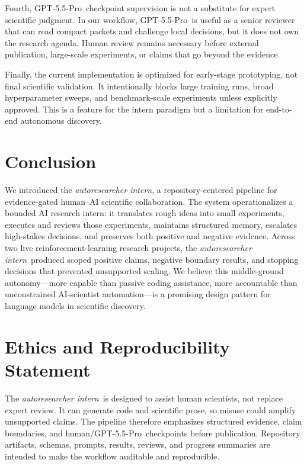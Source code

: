 \documentclass{article}
\newcommand{\intern}{\emph{autoresearcher intern}}
\newcommand{\gptpro}{GPT-5.5-Pro}
\begin{document}
Fourth, \gptpro\ checkpoint supervision is not a substitute for expert scientific judgment. In our workflow, \gptpro\ is useful as a senior reviewer that can read compact packets and challenge local decisions, but it does not own the research agenda. Human review remains necessary before external publication, large-scale experiments, or claims that go beyond the evidence.

Finally, the current implementation is optimized for early-stage prototyping, not final scientific validation. It intentionally blocks large training runs, broad hyperparameter sweeps, and benchmark-scale experiments unless explicitly approved. This is a feature for the intern paradigm but a limitation for end-to-end autonomous discovery.

\section{Conclusion}

We introduced the \intern, a repository-centered pipeline for evidence-gated human--AI scientific collaboration. The system operationalizes a bounded AI research intern: it translates rough ideas into small experiments, executes and reviews those experiments, maintains structured memory, escalates high-stakes decisions, and preserves both positive and negative evidence. Across two live reinforcement-learning research projects, the \intern\ produced scoped positive claims, negative boundary results, and stopping decisions that prevented unsupported scaling. We believe this middle-ground autonomy---more capable than passive coding assistance, more accountable than unconstrained AI-scientist automation---is a promising design pattern for language models in scientific discovery.

\section*{Ethics and Reproducibility Statement}

The \intern\ is designed to assist human scientists, not replace expert review. It can generate code and scientific prose, so misuse could amplify unsupported claims. The pipeline therefore emphasizes structured evidence, claim boundaries, and human/\gptpro\ checkpoints before publication. Repository artifacts, schemas, prompts, results, reviews, and progress summaries are intended to make the workflow auditable and reproducible.



\end{document}

